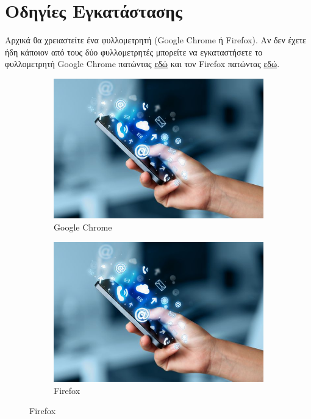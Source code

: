 \documentclass{article}
\begin{document}
\section*{Οδηγίες Εγκατάστασης}

Αρχικά θα χρειαστείτε ένα φυλλομετρητή (Google Chrome ή Firefox). Αν δεν έχετε ήδη κάποιον από τους δύο φυλλομετρητές μπορείτε να εγκαταστήσετε το φυλλομετρητή Google Chrome πατώντας \href{https://www.google.com/intl/en_uk/chrome/dr/download/?brand=JJTC&gclid=Cj0KCQjwtsCgBhDEARIsAE7RYh0p-X2d7kNkVFLPkWmugeV2VobmgNNGBRYp2fAA-5cahaJSEYdx50AaAlgwEALw_wcB&gclsrc=aw.ds}{εδώ} και τον Firefox πατώντας \href{https://www.mozilla.org/en-GB/firefox/new/}{εδώ}.

\begin{figure}[H]
    \centering
    \begin{subfigure}{.45\textwidth}
        \includegraphics[width=\textwidth]{logo}
        \caption{Google Chrome}
        \label{Fig:sub1}
    \end{subfigure}
    \hfill
    \begin{subfigure}{.45\textwidth}
        \includegraphics[width=\textwidth]{logo}
        \caption{Firefox}
        \label{Fig:sub2}
    \end{subfigure}
\end{figure}
\end{document}
